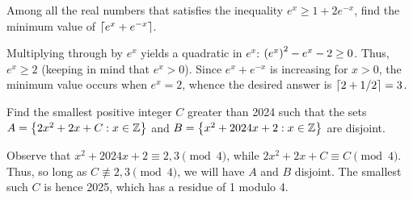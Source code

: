 \begin{question}[3]\label{A::2024-O-1-5}
    Among all the real numbers that satisfies the inequality $e^x \geq 1 + 2e^{-x}$, find the minimum value of $\left\lceil e^x + e^{-x} \right\rceil$.
\end{question}
\begin{solution*}
    Multiplying through by $e^x$ yields a quadratic in $e^x$: $\left( e^x \right)^2 - e^x - 2 \geq 0$. Thus, $e^x \geq 2$ (keeping in mind that $e^x > 0$). Since $e^x + e^{-x}$ is increasing for $x > 0$, the minimum value occurs when $e^x = 2$, whence the desired answer is $\left\lceil 2 + 1/2 \right\rceil = 3$.
\end{solution*}

\begin{question}[2025]\label{A::2024-O-1-6}
    Find the smallest positive integer $C$ greater than 2024 such that the sets $A = \left\lbrace 2x^2 + 2x + C : x \in \mathbb{Z} \right\rbrace$ and $B = \left\lbrace x^2 + 2024x + 2: x \in \mathbb{Z} \right\rbrace$ are disjoint.
\end{question}
\begin{solution*}
    Observe that $x^2 + 2024x + 2 \equiv 2, 3 \pmod{4}$, while $2x^2 + 2x + C \equiv C \pmod{4}$. Thus, so long as $C \not\equiv 2, 3 \pmod{4}$, we will have $A$ and $B$ disjoint. The smallest such $C$ is hence 2025, which has a residue of 1 modulo 4.
\end{solution*}

